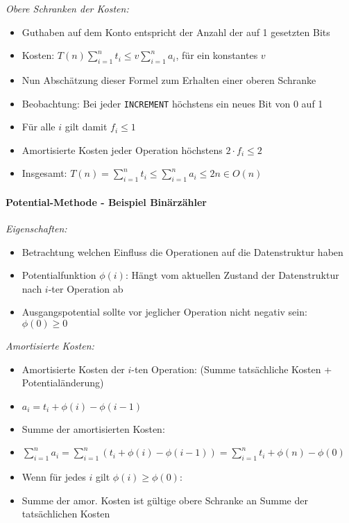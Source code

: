 \documentclass[
    ngerman,
    color=3b,
    summary,
    boxarc,
]{rubos-tuda-template}
\begin{document}
\textit{Obere Schranken der Kosten:}
          \begin{itemize}
              \item Guthaben auf dem Konto entspricht der Anzahl der auf 1 gesetzten Bits
              \item Kosten: $T(n) \sum^n_{i=1} t_i \leq v\sum^n_{i=1} a_i$, für ein konstantes $v$
              \item Nun Abschätzung dieser Formel zum Erhalten einer oberen Schranke
              \item Beobachtung: Bei jeder \texttt{INCREMENT} höchstens ein neues Bit von 0 auf 1
              \item Für alle $i$ gilt damit $f_i \leq 1$
              \item Amortisierte Kosten jeder Operation höchstens $2 \cdot f_i \leq 2$
              \item Insgesamt: $T(n) = \sum^n_{i=1} t_i \leq \sum^n_{i=1} a_i \leq 2n \in O(n)$
          \end{itemize}

\pagebreak

\paragraph{Potential-Methode - Beispiel Binärzähler}\mbox{}

\textit{Eigenschaften:}
\begin{itemize}
    \item Betrachtung welchen Einfluss die Operationen auf die Datenstruktur haben
    \item Potentialfunktion $\phi(i)$: Hängt vom aktuellen Zustand der Datenstruktur nach $i$-ter Operation ab
    \item Ausgangspotential sollte vor jeglicher Operation nicht negativ sein: $\phi(0) \geq 0$
\end{itemize}

\textit{Amortisierte Kosten:}
\begin{itemize}
    \item Amortisierte Kosten der $i$-ten Operation: (Summe tatsächliche Kosten + Potentialänderung)
    \item[] $a_i = t_i + \phi(i) - \phi(i-1)$
    \item Summe der amortisierten Kosten:
    \item[] $\sum^n_{i=1} a_i = \sum^n_{i=1} (t_i + \phi(i) - \phi(i - 1)) = \sum^n_{i=1} t_i + \phi(n) - \phi(0)$
    \item Wenn für jedes $i$ gilt $\phi(i) \geq \phi(0)$:
    \item[] Summe der amor. Kosten ist gültige obere Schranke an Summe der tatsächlichen Kosten
\end{itemize}
\end{document}
